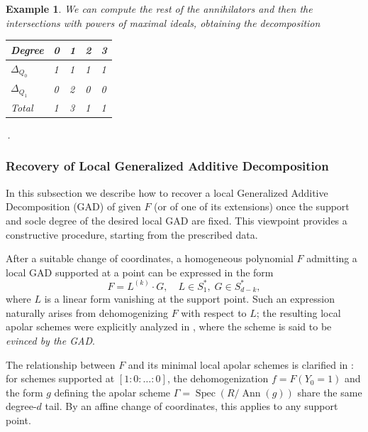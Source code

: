 \documentclass[a4paper,11p]{amsart}
\newtheorem{example0}[defn0]{Example}
\newenvironment{example}{ \begin{example0}\rm}{\end{example0}}
\begin{document}
\begin{example}
We can compute the rest of the annihilators and then the intersections with powers of maximal ideals, obtaining the decomposition 

\begin{table}[h]
\centering
\begin{tabular}{|l|l|l|l|l|}
\hline
Degree         & 0 & 1 & 2 & 3  \\ \hline
$\Delta_{Q_0}$ & 1 & 1 & 1 & 1  \\ \hline
$\Delta_{Q_1}$ & 0 & 2 & 0 & 0  \\ \hline
Total          & 1 & 3 & 1 & 1  \\ \hline
\end{tabular} \,.
\end{table}

\end{example}
\subsubsection{Recovery of Local Generalized Additive Decomposition}\label{Section:GAD}

In this subsection we describe how to recover a local Generalized Additive Decomposition (GAD) of  given $F$ (or of one of its extensions) once the support and socle degree of the desired local GAD are fixed.
This viewpoint provides a constructive procedure, starting from the prescribed data.

After a suitable change of coordinates, a homogeneous polynomial $F$ admitting a local GAD supported at a point can be expressed in the form
\begin{equation}\label{GADLocal}
    F = L^{(k)} \cdot G, \quad L \in S_1^*, \; G \in S_{d-k}^*,
\end{equation}
where $L$ is a linear form vanishing at the support point.  
Such an expression naturally arises from dehomogenizing $F$ with respect to $L$; the resulting local apolar schemes were explicitly analyzed in \cite{GAD}, where the scheme is said to be \emph{evinced by the GAD}.




The relationship between $F$ and its minimal local apolar schemes is clarified in \cite[Proposition~4]{BJPR}: for schemes supported at $[1:0:\dots:0]$, the dehomogenization $f = F(Y_0=1)$ and the form $g$ defining the apolar scheme $\Gamma = \operatorname{Spec}(R/\operatorname{Ann}(g))$  share the same degree-$d$ tail. By an affine change of coordinates, this applies to any support point.
\end{document}
